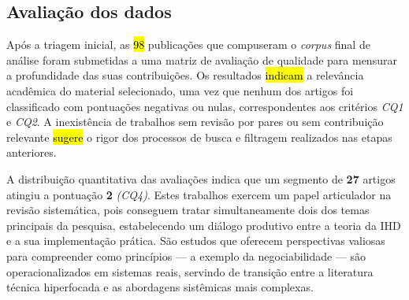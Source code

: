 \documentclass[
	12pt,				%
	oneside,			%
	a4paper,			%
	english,			%
	brazil				%
	]{abntex2ppgsi}
\begin{document}

 
 \subsection{Avaliação dos dados}

    Após a triagem inicial, as \hl{98} publicações que compuseram o \textit{corpus} final de análise foram submetidas a uma matriz de avaliação de qualidade para mensurar a profundidade das suas contribuições. Os resultados \hl{indicam} a relevância acadêmica do material selecionado, uma vez que nenhum dos artigos foi classificado com pontuações negativas ou nulas, correspondentes aos critérios \textit{CQ1} e \textit{CQ2}. A inexistência de trabalhos sem revisão por pares ou sem contribuição relevante \hl{sugere} o rigor dos processos de busca e filtragem realizados nas etapas anteriores.

    A distribuição quantitativa das avaliações indica que um segmento de \textbf{27} artigos atingiu a pontuação \textbf{2} \textit{(CQ4)}. Estes trabalhos exercem um papel articulador na revisão sistemática, pois conseguem tratar simultaneamente dois dos temas principais da pesquisa, estabelecendo um diálogo produtivo entre a teoria da IHD e a sua implementação prática. São estudos que oferecem perspectivas valiosas para compreender como princípios — a exemplo da negociabilidade — são operacionalizados em sistemas reais, servindo de transição entre a literatura técnica hiperfocada e as abordagens sistêmicas mais complexas.
\end{document}
